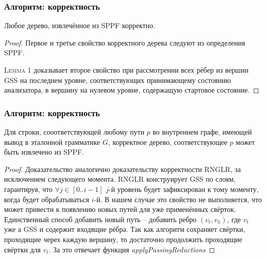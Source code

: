 \documentclass{beamer}
\begin{document}
\begin{frame}
    \transwipe[direction=90]
    \frametitle{Алгоритм: корректность}
    \begin{theorem}
       Любое дерево, извлечённое из SPPF корректно.
    \end{theorem}

    \begin{proof}
      Первое и третье свойство корректного дерева следуют из определения SPPF. 

      \textsc{Lemma 1} доказывает второе свойство при рассмотрении всех рёбер из вершин GSS на последнем уровне, соответствующих принимающему состоянию анализатора, в вершину на 
      нулевом уровне, содержащую стартовое состояние.

    \end{proof}

\end{frame}

\begin{frame}
    \transwipe[direction=90]
    \frametitle{Алгоритм: корректность}
    \begin{theorem}
      Для строки, сооответствующей любому пути $p$ во внутреннем графе, имеющей вывод в эталонной грамматике $G$, корректное дерево, соответствующее $p$ может быть извлечено из SPPF.
    \end{theorem}

    \begin{proof}
Доказательство аналогично доказательству корректности RNGLR, за исключением следующего момента. RNGLR конструирует GSS по слоям, гарантируя, что $\forall j \in [0..i-1]$ $j$-й уровень будет зафиксирован к тому 
моменту, когда будет обрабатываться $i$-й. В нашем случае это свойство не выполняется, что может привести к появлению новых путей для уже применённых свёрток. Единственный способ добавить новый путь --
добавить ребро $(v_{t}, v_{h})$, где $v_{t}$ уже а GSS и содержит входящие рёбра. Так как алгоритм сохраняет свёртки, проходящие черех каждую вершину, то достаточно продолжить проходящие свёртки 
для $v_{t}$. За это отвечает функция \emph{applyPassingReductions} 
    \end{proof}

\end{frame}
\end{document}
